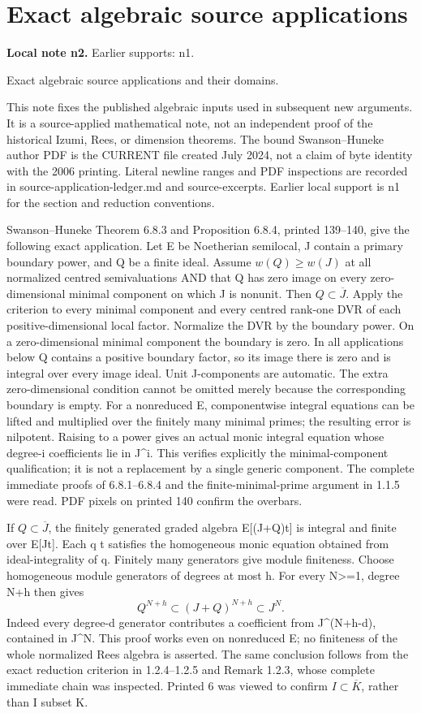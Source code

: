 \documentclass[11pt]{article}
\begin{document}
\section{Exact algebraic source applications}
\label{sec:n2}
\noindent\textbf{Local note n2.} Earlier supports: n1.

Exact algebraic source applications and their domains.

This note fixes the published algebraic inputs used in subsequent new arguments. It is a source-applied mathematical note, not an independent proof of the historical Izumi, Rees, or dimension theorems. The bound Swanson--Huneke author PDF is the CURRENT file created July 2024, not a claim of byte identity with the 2006 printing. Literal newline ranges and PDF inspections are recorded in source-application-ledger.md and source-excerpts. Earlier local support is n1 for the section and reduction conventions.

Swanson--Huneke Theorem 6.8.3 and Proposition 6.8.4, printed 139--140, give the following exact application. Let E be Noetherian semilocal, J contain a primary boundary power, and Q be a finite ideal. Assume \(w(Q)\ge w(J)\) at all normalized centred semivaluations AND that Q has zero image on every zero-dimensional minimal component on which J is nonunit. Then \(Q\subset\overline J\). Apply the criterion to every minimal component and every centred rank-one DVR of each positive-dimensional local factor. Normalize the DVR by the boundary power. On a zero-dimensional minimal component the boundary is zero. In all applications below Q contains a positive boundary factor, so its image there is zero and is integral over every image ideal. Unit J-components are automatic. The extra zero-dimensional condition cannot be omitted merely because the corresponding boundary is empty. For a nonreduced E, componentwise integral equations can be lifted and multiplied over the finitely many minimal primes; the resulting error is nilpotent. Raising to a power gives an actual monic integral equation whose degree-i coefficients lie in J\textasciicircum{}i. This verifies explicitly the minimal-component qualification; it is not a replacement by a single generic component. The complete immediate proofs of 6.8.1--6.8.4 and the finite-minimal-prime argument in 1.1.5 were read. PDF pixels on printed 140 confirm the overbars.

If \(Q\subset\overline J\), the finitely generated graded algebra E[(J+Q)t] is integral and finite over E[Jt]. Each q t satisfies the homogeneous monic equation obtained from ideal-integrality of q. Finitely many generators give module finiteness. Choose homogeneous module generators of degrees at most h. For every N>=1, degree N+h then gives
\[
 Q^{N+h}\subset (J+Q)^{N+h}\subset J^N.
\]
Indeed every degree-d generator contributes a coefficient from J\textasciicircum{}(N+h-d), contained in J\textasciicircum{}N. This proof works even on nonreduced E; no finiteness of the whole normalized Rees algebra is asserted. The same conclusion follows from the exact reduction criterion in 1.2.4--1.2.5 and Remark 1.2.3, whose complete immediate chain was inspected. Printed 6 was viewed to confirm \(I\subset\overline K\), rather than I subset K.
\end{document}
